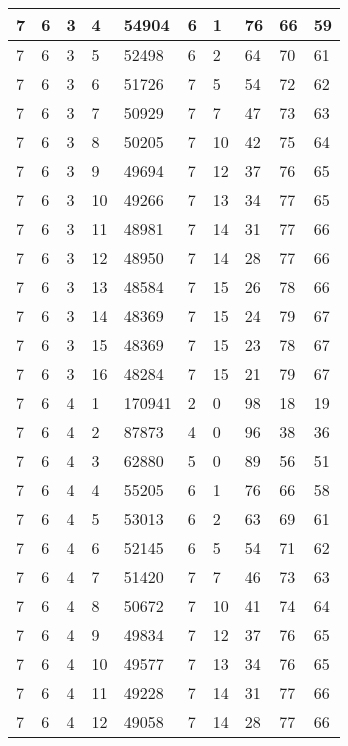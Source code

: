 \begin{table}[!ht]
\begin{tabular}{|l|l|l|l|l|l|l|l|l|l|}
        7 & 6 & 3 & 4 & 54904 & 6 & 1 & 76 & 66 & 59 \\ \hline
        7 & 6 & 3 & 5 & 52498 & 6 & 2 & 64 & 70 & 61 \\ \hline
        7 & 6 & 3 & 6 & 51726 & 7 & 5 & 54 & 72 & 62 \\ \hline
        7 & 6 & 3 & 7 & 50929 & 7 & 7 & 47 & 73 & 63 \\ \hline
        7 & 6 & 3 & 8 & 50205 & 7 & 10 & 42 & 75 & 64 \\ \hline
        7 & 6 & 3 & 9 & 49694 & 7 & 12 & 37 & 76 & 65 \\ \hline
        7 & 6 & 3 & 10 & 49266 & 7 & 13 & 34 & 77 & 65 \\ \hline
        7 & 6 & 3 & 11 & 48981 & 7 & 14 & 31 & 77 & 66 \\ \hline
        7 & 6 & 3 & 12 & 48950 & 7 & 14 & 28 & 77 & 66 \\ \hline
        7 & 6 & 3 & 13 & 48584 & 7 & 15 & 26 & 78 & 66 \\ \hline
        7 & 6 & 3 & 14 & 48369 & 7 & 15 & 24 & 79 & 67 \\ \hline
        7 & 6 & 3 & 15 & 48369 & 7 & 15 & 23 & 78 & 67 \\ \hline
        7 & 6 & 3 & 16 & 48284 & 7 & 15 & 21 & 79 & 67 \\ \hline
        7 & 6 & 4 & 1 & 170941 & 2 & 0 & 98 & 18 & 19 \\ \hline
        7 & 6 & 4 & 2 & 87873 & 4 & 0 & 96 & 38 & 36 \\ \hline
        7 & 6 & 4 & 3 & 62880 & 5 & 0 & 89 & 56 & 51 \\ \hline
        7 & 6 & 4 & 4 & 55205 & 6 & 1 & 76 & 66 & 58 \\ \hline
        7 & 6 & 4 & 5 & 53013 & 6 & 2 & 63 & 69 & 61 \\ \hline
        7 & 6 & 4 & 6 & 52145 & 6 & 5 & 54 & 71 & 62 \\ \hline
        7 & 6 & 4 & 7 & 51420 & 7 & 7 & 46 & 73 & 63 \\ \hline
        7 & 6 & 4 & 8 & 50672 & 7 & 10 & 41 & 74 & 64 \\ \hline
        7 & 6 & 4 & 9 & 49834 & 7 & 12 & 37 & 76 & 65 \\ \hline
        7 & 6 & 4 & 10 & 49577 & 7 & 13 & 34 & 76 & 65 \\ \hline
        7 & 6 & 4 & 11 & 49228 & 7 & 14 & 31 & 77 & 66 \\ \hline
        7 & 6 & 4 & 12 & 49058 & 7 & 14 & 28 & 77 & 66 \\ \hline

\end{tabular}
\end{table}
